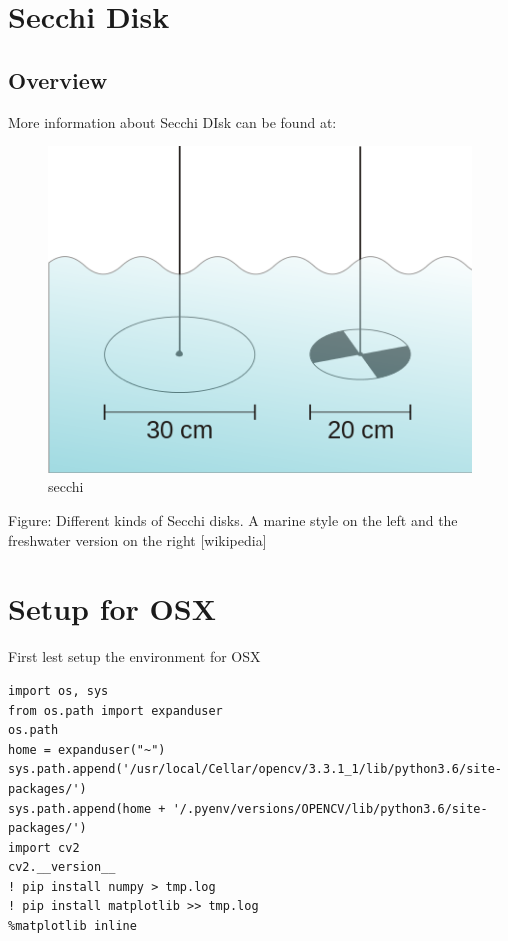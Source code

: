 \newpage
\section{Secchi Disk}\label{c:secchi-disk}

\subsection{Overview}\label{overview}

More information about Secchi DIsk can be found at:


\begin{figure}[htb]
\centering
\includegraphics[height=0.25\textheight]{secchi/disk.png}
\caption{secchi}
\end{figure}

Figure: Different kinds of Secchi disks. A marine style on the left and
the freshwater version on the right {[}wikipedia{]}

\section{Setup for OSX}\label{setup-for-osx}

First lest setup the environment for OSX

\begin{verbatim}
import os, sys
from os.path import expanduser
os.path
home = expanduser("~")
sys.path.append('/usr/local/Cellar/opencv/3.3.1_1/lib/python3.6/site-packages/')
sys.path.append(home + '/.pyenv/versions/OPENCV/lib/python3.6/site-packages/')
import cv2
cv2.__version__
! pip install numpy > tmp.log
! pip install matplotlib >> tmp.log
%matplotlib inline
\end{verbatim}

